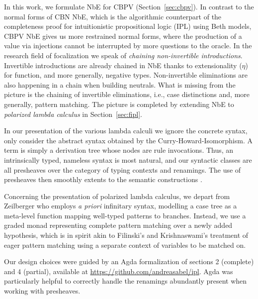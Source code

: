 \documentclass[sigplan,screen,fleqn]{acmart}
\begin{document}
In this work, we formulate NbE for CBPV
(Section~\ref{sec:cbpv}).
%
In contrast to the normal forms of CBN NbE, which is the algorithmic
counterpart of the completeness proof for intuitionistic propositional
logic (IPL) using Beth models, CBPV NbE gives us more restrained
normal forms, where the production of a value via injections cannot be
interrupted by more questions to the oracle.  In the research field of
focalization \cite{andreoli:focusing,liangMiller:csl07} we speak of
\emph{chaining non-invertible introductions}.
Invertible introductions are already chained in NbE thanks to
extensionality ($\eta$) for function, and more generally, negative
types.  Non-invertible eliminations are also happening in a chain when
building neutrals.  What is missing from the picture is the chaining
of invertible eliminations, i.e., case distinctions and, more
generally, pattern matching.  The picture is completed by extending
NbE to \emph{polarized lambda calculus}
\cite{zeilberger:PhD,brockNannestadSchuermann:lpar10,espiritoSanto:entcs17}
in Section~\ref{sec:fipl}.


In our presentation of the various lambda calculi we ignore the
concrete syntax, only consider the abstract syntax obtained by the
Curry-Howard-Isomorphism.  A term is simply a derivation tree whose
nodes are rule invocations.  Thus, an intrinsically typed,
nameless syntax is most natural,
and our syntactic classes are all presheaves over the category of
typing contexts and renamings.  The use of presheaves then smoothly
extents to the semantic constructions
\cite{catarina:csl93,altenkirchHofmannStreicher:ctcs95}.

Concerning the presentation of polarized lambda calculus, we depart from
Zeilberger \cite{zeilberger:PhD} who employs \emph{a priori}
infinitary syntax, modelling a case tree as a meta-level function mapping
well-typed patterns to branches.  Instead, we use a graded monad
representing complete pattern matching over a newly added hypothesis,
which is in spirit akin to Filinski's \cite[Section~4]{filinski:tlca01}
and Krishnaswami's \cite{krishnaswami:popl09} treatment of eager
pattern matching using a separate context of variables to be matched
on.

Our design choices were guided by an Agda formalization of sections 2
(complete) and 4 (partial), available at \url{https://github.com/andreasabel/ipl}.
Agda was particularly helpful to correctly handle the renamings
abundantly present when working with presheaves.
\end{document}
